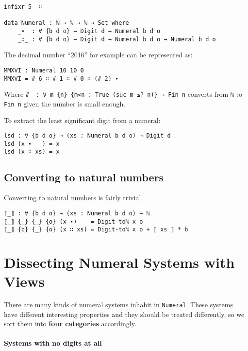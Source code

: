 \documentclass[../thesis.tex]{subfiles}
\begin{document}
\begin{lstlisting}
infixr 5 _∷_

data Numeral : ℕ → ℕ → ℕ → Set where
    _∙  : ∀ {b d o} → Digit d → Numeral b d o
    _∷_ : ∀ {b d o} → Digit d → Numeral b d o → Numeral b d o
\end{lstlisting}

The decimal number ``2016'' for example can be represented as:

\begin{lstlisting}
MMXVI : Numeral 10 10 0
MMXVI = # 6 ∷ # 1 ∷ # 0 ∷ (# 2) ∙
\end{lstlisting}

Where {\lstinline|#_ : ∀ m {n} {m<n : True (suc m ≤? n)} → Fin n|} converts from
{\lstinline|ℕ|} to {\lstinline|Fin n|} given the number is small enough.

To extract the least significant digit from a numeral:

\begin{lstlisting}
lsd : ∀ {b d o} → (xs : Numeral b d o) → Digit d
lsd (x ∙   ) = x
lsd (x ∷ xs) = x
\end{lstlisting}

\subsection{Converting to natural numbers}

Converting to natural numbers is fairly trivial.

\begin{lstlisting}
⟦_⟧ : ∀ {b d o} → (xs : Numeral b d o) → ℕ
⟦_⟧ {_} {_} {o} (x ∙)    = Digit-toℕ x o
⟦_⟧ {b} {_} {o} (x ∷ xs) = Digit-toℕ x o + ⟦ xs ⟧ * b
\end{lstlisting}


\section{Dissecting Numeral Systems with Views}\label{views}

There are many kinds of numeral systems inhabit in {\lstinline|Numeral|}.
These systems have different interesting properties and they should be treated
differently, so we sort them into \textbf{four categories} accordingly.

\paragraph{Systems with no digits at all}
\end{document}
